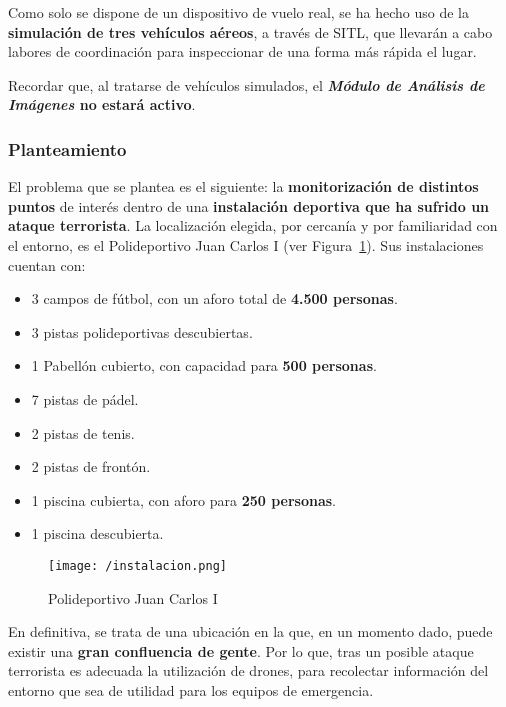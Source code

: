Como solo se dispone de un dispositivo de vuelo real, se ha hecho uso de la \textbf{simulación de tres vehículos aéreos}, a través de \acs{SITL}, que llevarán a cabo labores de coordinación para inspeccionar de una forma más rápida el lugar.

Recordar que, al tratarse de vehículos simulados, el \textbf{\textit{Módulo de Análisis de Imágenes} no estará activo}. 


\subsubsection{Planteamiento}

El problema que se plantea es el siguiente: la \textbf{monitorización de distintos puntos} de interés dentro de una \textbf{instalación deportiva que ha sufrido un ataque terrorista}. La localización elegida, por cercanía y por familiaridad con el entorno, es el Polideportivo Juan Carlos I (ver Figura~\ref{fig:instalacion}). Sus instalaciones cuentan con:
\begin{itemize}
\item 3 campos de fútbol, con un aforo total de \textbf{4.500 personas}.
\item 3 pistas polideportivas descubiertas.
\item 1 Pabellón cubierto, con capacidad para \textbf{500 personas}.
\item 7 pistas de pádel.
\item 2 pistas de tenis.
\item 2 pistas de frontón.
\item 1 piscina cubierta, con aforo para \textbf{250 personas}.
\item 1 piscina descubierta. \\
\end{itemize}

\begin{figure}[!h]
\begin{center}
\texttt{[image: /instalacion.png]}
\caption[Polideportivo Juan Carlos I]{Polideportivo Juan Carlos I}
\label{fig:instalacion}
\end{center}
\end{figure}

En definitiva, se trata de una ubicación en la que, en un momento dado, puede existir una \textbf{gran confluencia de gente}. Por lo que, tras un posible ataque terrorista es adecuada la utilización de drones, para recolectar información del entorno que sea de utilidad para los equipos de emergencia.

